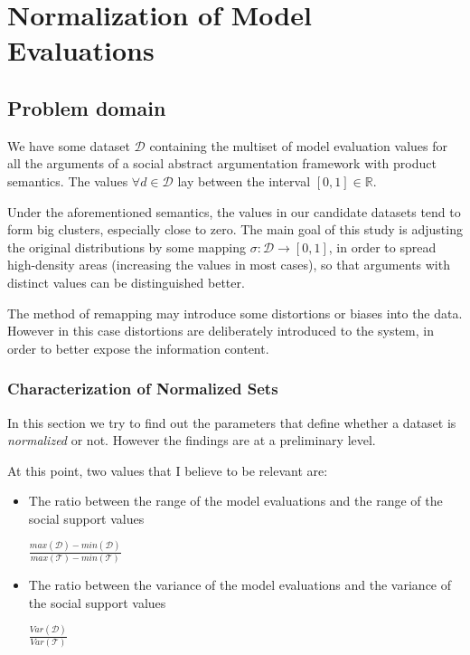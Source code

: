 \documentclass{article}
\newtheorem{property}{Property}
\newcommand{\dataset}{\mathcal{D}}   %
\newcommand{\ssset}{\mathcal{T}}   %
\begin{document}

\section{Normalization of Model Evaluations}



\subsection{Problem domain}
We have some dataset $\dataset$ containing the multiset of model evaluation values for all the arguments of a social abstract argumentation framework with product semantics. The values $\forall d \in \dataset$ lay between the interval $[0,1] \in \mathbb{R}$.

Under the aforementioned semantics, the values in our candidate datasets tend to form big clusters, especially close to zero. The main goal of this study is adjusting the original distributions by some mapping $\sigma: \dataset  \rightarrow  [0,1]$, in order to spread high-density areas (increasing the values in most cases), so that arguments with distinct values can be distinguished better.

The method of remapping may introduce some distortions or biases into the data. However in this case distortions are deliberately introduced to the system, in order to better expose the information content. 

\subsubsection{Characterization of Normalized Sets}

In this section we try to find out the parameters that define whether a dataset is \textit{normalized} or not. However the findings are at a preliminary level.

At this point, two values that I believe to be relevant are:
\begin{itemize}
\item The ratio between the range of the model evaluations and the range of the social support values

\begin{center}
 $\frac{max(\dataset) - min(\dataset)}{max(\ssset) - min(\ssset)}$
\end{center}
\item The ratio between the variance of the model evaluations and the variance of the social support values

\begin{center}
$\frac{Var(\dataset)}{Var(\ssset)}$
\end{center}
\end{itemize}
\end{document}
